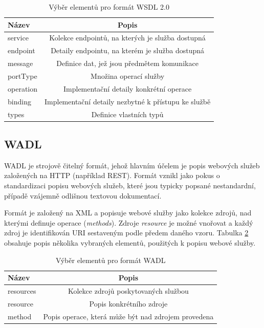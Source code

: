 \documentclass[czech,DP]{thesiskiv}
\begin{document}
\begin{table}[h]
	\centering
	\begin{tabular}{|l|c|}
		\hline
		Název & Popis \\
		\hline
		\hline
		service & Kolekce endpointů, na kterých je služba dostupná \\
		\hline
		endpoint & Detaily endpointu, na kterém je služba dostupná \\
		\hline
		message & Definice dat, jež jsou předmětem komunikace \\
		\hline
		portType & Množina operací služby \\		
		\hline
		operation & Implementační detaily konkrétní operace \\
		\hline
		binding & Implementační detaily nezbytné k přístupu ke službě \\
		\hline
		types & Definice vlastních typů \\
		\hline
		
	\end{tabular}
	\caption{Výběr elementů pro formát WSDL 2.0}
	\label{tab:wsdl-elements} 
\end{table}
 
\subsection{WADL}

WADL je strojově čitelný formát, jehož hlavním účelem je popis webových služeb založených na HTTP (například REST). Formát vznikl jako pokus o standardizaci popisu webových služeb, které jsou typicky popsané nestandardní, případě vzájemně odlišnou textovou dokumentací\cite{wadlSpec}.

Formát je založený na XML a popisuje webové služby jako kolekce zdrojů, nad kterými definuje operace (\textit{methods}). Zdroje \textit{resource} je možné vnořovat a každý zdroj je identifikován URI sestaveným podle předem daného vzoru. Tabulka \ref{tab:wadl-elements} obsahuje popis několika vybraných elementů, použitých k popisu webové služby.

\begin{table}[h]
	\centering
	\begin{tabular}{|l|c|}
		\hline
		Název & Popis \\
		\hline
		\hline
		resources & Kolekce zdrojů poskytovaných službou \\
		\hline
		resource & Popis konkrétního zdroje \\
		\hline
		method & Popis operace, která může být nad zdrojem provedena \\
		\hline
	\end{tabular}
	\caption{Výběr elementů pro formát WADL}
	\label{tab:wadl-elements} 
\end{table}
 
\end{document}
